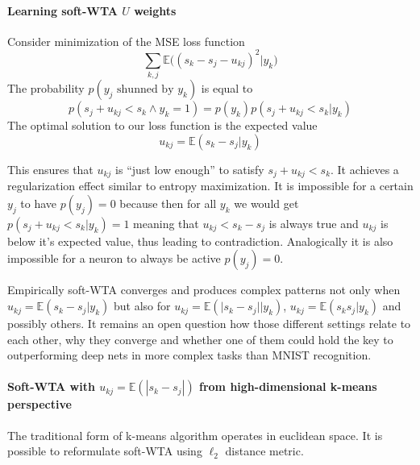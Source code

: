 \documentclass[12pt]{article}
\DeclareMathOperator*{\argmax}{argmax}
\begin{document}
\paragraph{Learning soft-WTA $U$ weights}

Consider minimization of the MSE loss function
\[
\sum_{k,j}\mathbb{E}\big((s_k-s_j - u_{kj})^2|y_k\big)
\]
The probability $p(y_j\text{ shunned by } y_k)$ is equal to
\[
p(s_j+u_{kj}<s_k \wedge y_k=1) = p(y_k)p(s_j+u_{kj}<s_k|y_k)
\]
The optimal solution to our loss function is the expected value
\[u_{kj}=\mathbb{E}(s_k-s_j|y_k)\]

This ensures that $u_{kj}$ is ``just low enough'' to satisfy $s_j+u_{kj}<s_k$.
It achieves a regularization effect similar to entropy maximization. It is impossible for a certain $y_j$ to have $p(y_j)=0$ because then for all $y_k$ we would get
$p(s_j+u_{kj}<s_k|y_k)=1$ meaning that $u_{kj}<s_k-s_j$ is always true and $u_{kj}$ is below it's expected value, thus leading to contradiction. Analogically it is also impossible for a neuron to always be active  $p(y_j)=0$. 

Empirically soft-WTA converges and produces complex patterns not only when $u_{kj}=\mathbb{E}(s_k-s_j|y_k)$ but also for $u_{kj}=\mathbb{E}(\lvert s_k-s_j\rvert  |y_k)$, $u_{kj}=\mathbb{E}( s_k s_j |y_k)$ and possibly others. It remains an open question how those different settings relate to each other, why they converge and whether one of them could hold the key to outperforming deep nets in more complex tasks than MNIST recognition.

 

\paragraph{Soft-WTA with $u_{kj}=\mathbb{E}(|s_k-s_j|)$ from high-dimensional k-means perspective}
The traditional form of k-means algorithm operates in euclidean space. It is possible to reformulate soft-WTA using $\ell_2$ distance metric. 
\end{document}
